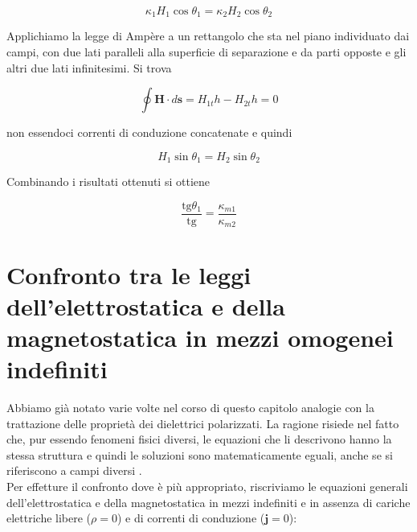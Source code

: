 \begin{tcolorbox}[colback=yellow!10!white, colframe=orange!70!black, boxrule=0.8pt]
\begin{equation}
        \kappa_1 H_1 \cos \theta_1 = \kappa_2 H_2 \cos \theta _2
\end{equation}
\end{tcolorbox}

Applichiamo la legge di Ampère a un rettangolo che sta nel piano individuato dai campi, con due lati paralleli alla superficie di separazione e da parti opposte e gli altri due lati infinitesimi. Si trova

\begin{equation}
    \oint \mathbf{H} \cdot d \mathbf{s}  = H_{1t} h - H_{2t} h = 0
\end{equation}

non essendoci correnti di conduzione concatenate e quindi 

\begin{tcolorbox}[colback=yellow!10!white, colframe=orange!70!black, boxrule=0.8pt]
\begin{equation}
        H_1 \sin \theta_1 =  H_2 \sin \theta _2
\end{equation}
\end{tcolorbox}

Combinando i risultati ottenuti si ottiene

\begin{tcolorbox}[colback=yellow!10!white, colframe=orange!70!black, boxrule=0.8pt]
\begin{equation}
        \frac{\text{tg} \theta_1}{\text{tg}} = \frac{\kappa_{m1}}{\kappa_{m2}}
\end{equation}
\end{tcolorbox}

\section{Confronto tra le leggi dell'elettrostatica e della magnetostatica in mezzi omogenei indefiniti}

Abbiamo già notato varie volte nel corso di questo capitolo analogie con la trattazione delle proprietà dei dielettrici polarizzati. 
La ragione risiede nel fatto che, pur essendo fenomeni fisici diversi, le equazioni che li descrivono hanno la stessa struttura e quindi le soluzioni sono matematicamente eguali, anche se si riferiscono a campi diversi .\\

Per effetture il confronto dove è più appropriato, riscriviamo le equazioni generali dell'elettrostatica e della magnetostatica in mezzi indefiniti e in assenza di cariche elettriche libere ($\rho = 0$) e di correnti di conduzione ($\mathbf{j} = 0$):

